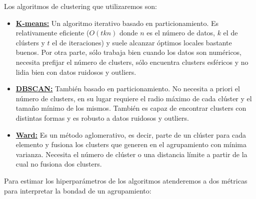 \documentclass[oneside]{book}
\begin{document}
Los algoritmos de clustering que utilizaremos son:
\begin{itemize}
\item \href{https://en.wikipedia.org/wiki/K-means_clustering}{\textbf{K-means:}} Un algoritmo iterativo basado en
  particionamiento. Es relativamente eficiente ($O(tkn)$ donde $n$ es
  el número de datos, $k$ el de clústers y $t$ el de iteraciones) y
  suele alcanzar óptimos locales bastante buenos. Por otra parte, sólo
  trabaja bien cuando los datos son numéricos, necesita prefijar el
  número de clusters, sólo encuentra clusters esféricos y no lidia
  bien con datos ruidosos y outliers.

\item
  \href{https://en.wikipedia.org/wiki/DBSCAN}{\textbf{DBSCAN:}}
  También basado en particionamiento. No necesita a priori el número
  de clusters, en su lugar requiere el radio máximo de cada clúster y
  el tamaño mínimo de los mismos. También es capaz de encontrar
  clusters con distintas formas y es robusto a datos ruidosos y
  outliers.

\item \href{https://en.wikipedia.org/wiki/Ward%27s_method}
    {\textbf{Ward:}} Es un método aglomerativo, es decir, parte de un
    clúster para cada elemento y fusiona los clusters que generen en
    el agrupamiento con mínima varianza. Necesita el número de clúster
    o una distancia límite a partir de la cual no fusiona dos
    clusters.
\end{itemize}

Para estimar los hiperparámetros de los algoritmos atenderemos a dos
métricas para interpretar la bondad de un agrupamiento:
\end{document}
